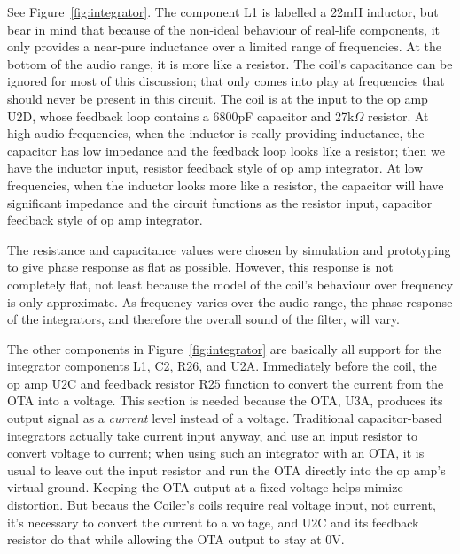 See Figure~\ref{fig:integrator}.  The component L1 is labelled a 22mH
inductor, but bear in mind that because of the non-ideal behaviour of
real-life components, it only provides a near-pure inductance over a limited
range of frequencies.  At the bottom of the audio range, it is more like a
resistor.  The coil's capacitance can be ignored for most of this
discussion; that only comes into play at frequencies that should never be
present in this circuit.  The coil is at the input to the op amp U2D, whose
feedback loop contains a 6800pF capacitor and 27k$\Omega$ resistor.  At high
audio frequencies, when the inductor is really providing inductance, the
capacitor has low impedance and the feedback loop looks like a resistor;
then we have the inductor input, resistor feedback style of op amp
integrator.  At low frequencies, when the inductor looks more like a
resistor, the capacitor will have significant impedance and the circuit
functions as the resistor input, capacitor feedback style of op amp
integrator.

The resistance and capacitance values were chosen by simulation and
prototyping to give phase response as flat as possible.  However, this
response is not completely flat, not least because the model of the coil's
behaviour over frequency is only approximate.  As frequency varies over the
audio range, the phase response of the integrators, and therefore the
overall sound of the filter, will vary.

The other components in Figure~\ref{fig:integrator} are basically all
support for the integrator components L1, C2, R26, and U2A.  Immediately
before the coil, the op amp U2C and feedback resistor R25 function to
convert the current from the OTA into a voltage.  This section is needed
because the OTA, U3A, produces its output signal as a \emph{current} level
instead of a voltage.  Traditional capacitor-based integrators actually take
current input anyway, and use an input resistor to convert voltage to
current; when using such an integrator with an OTA, it is usual to leave out
the input resistor and run the OTA directly into the op amp's virtual
ground.  Keeping the OTA output at a fixed voltage helps mimize distortion. 
But becaus the Coiler's coils require real voltage input, not current, it's
necessary to convert the current to a voltage, and U2C and its feedback
resistor do that while allowing the OTA output to stay at 0V.

